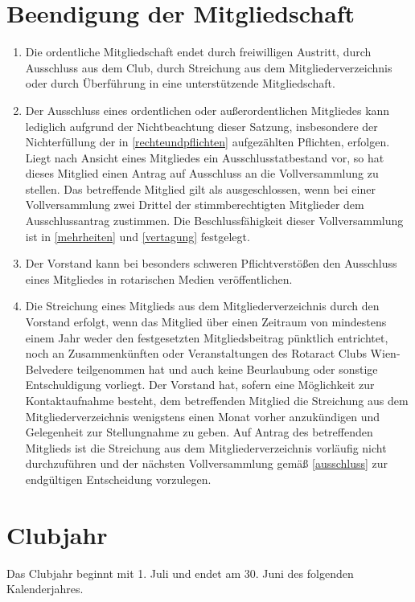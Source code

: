 \documentclass{statutclass}
\begin{document}
\section{Beendigung der Mitgliedschaft}
\begin{enumerate}
    \item Die ordentliche Mitgliedschaft endet durch freiwilligen Austritt, durch Ausschluss aus dem Club, durch Streichung aus dem Mitgliederverzeichnis oder durch Überführung in eine unterstützende Mitgliedschaft.
    \item\label{ausschluss} Der Ausschluss eines ordentlichen oder außerordentlichen Mitgliedes kann lediglich aufgrund der Nichtbeachtung dieser Satzung, insbesondere der Nichterfüllung der in \ref{rechteundpflichten} aufgezählten Pflichten, erfolgen. Liegt nach Ansicht eines Mitgliedes ein Ausschlusstatbestand vor, so hat dieses Mitglied einen Antrag auf Ausschluss an die Vollversammlung zu stellen. Das betreffende Mitglied gilt als ausgeschlossen, wenn bei einer Vollversammlung zwei Drittel der stimmberechtigten Mitglieder dem Ausschlussantrag zustimmen. Die Beschlussfähigkeit dieser Vollversammlung ist in \ref{mehrheiten} und \ref{vertagung} festgelegt. 
    \item Der Vorstand kann bei besonders schweren Pflichtverstößen den Ausschluss eines Mitgliedes in rotarischen Medien veröffentlichen. 
    \item Die Streichung eines Mitglieds aus dem Mitgliederverzeichnis durch den Vorstand erfolgt, wenn das Mitglied über einen Zeitraum von mindestens einem Jahr weder den festgesetzten Mitgliedsbeitrag pünktlich entrichtet, noch an Zusammenkünften oder Veranstaltungen des Rotaract Clubs Wien-Belvedere teilgenommen hat und auch keine Beurlaubung oder sonstige Entschuldigung vorliegt. Der Vorstand hat, sofern eine Möglichkeit zur Kontaktaufnahme besteht, dem betreffenden Mitglied die Streichung aus dem Mitgliederverzeichnis wenigstens einen Monat vorher anzukündigen und Gelegenheit zur Stellungnahme zu geben. Auf Antrag des betreffenden Mitglieds ist die Streichung aus dem Mitgliederverzeichnis vorläufig nicht durchzuführen und der nächsten Vollversammlung gemäß \ref{ausschluss} zur endgültigen Entscheidung vorzulegen.
\end{enumerate}

\section{Clubjahr}
Das Clubjahr beginnt mit 1. Juli und endet am 30. Juni des folgenden Kalenderjahres.
\end{document}
